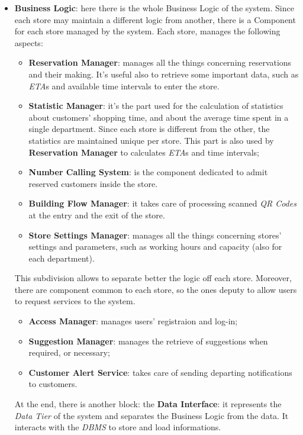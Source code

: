 \documentclass{article}
\begin{document}
\begin{itemize}
		\item{\bfseries Business Logic}: here there is the whole Business Logic of the system. Since each store may maintain a different logic from another, there is a Component for each store managed by the system. Each store, manages the following aspects:
		\begin{itemize}
			\item{\bfseries Reservation Manager}: manages all the things concerning reservations and their making. It's useful also to retrieve some important data, such as \emph{ETA}s and available time intervals to enter the store.
			\item{\bfseries Statistic Manager}: it's the part used for the calculation of statistics about customers' shopping time, and about the average time spent in a single department. Since each store is different from the other, the statistics are maintained unique per store. This part is also used by \textbf{Reservation Manager} to calculates \emph{ETA}s and time intervals;
			\item{\bfseries Number Calling System}: is the component dedicated to admit reserved customers inside the store.
			\item{\bfseries Building Flow Manager}: it takes care of processing scanned \emph{QR Codes} at the entry and the exit of the store.
			\item{\bfseries Store Settings Manager}: manages all the things concerning stores' settings and parameters, such as working hours and capacity (also for each department).
			
		\end{itemize} This subdivision allows to separate better the logic off each store. Moreover, there are component common to each store, so the ones deputy to allow users to request services to the system.
		\begin{itemize}
			\item {\bfseries Access Manager}: manages users' registraion and log-in;
			\item {\bfseries Suggestion Manager}: manages the retrieve of suggestions when required, or necessary;
			\item{\bfseries Customer Alert Service}: takes care of sending departing notifications to customers.
		\end{itemize}
	At the end, there is another block: the \textbf{Data Interface}: it represents the \emph{Data Tier} of the system and separates the Business Logic from the data. It interacts with the \emph{DBMS} to store and load informations.
	\end{itemize}
\end{document}
